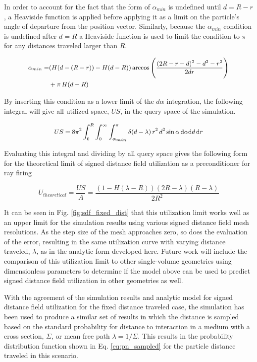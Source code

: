 In order to account for the fact that the form of $\alpha_{min}$ is undefined
until $d = R-r$, a Heaviside function is applied before applying it as a limit
on the particle's angle of departure from the position vector. Similarly,
because the $\alpha_{min}$ condition is undefined after $d=R$ a Heaviside
function is used to limit the condition to $\pi$ for any distances traveled
larger than $R$.

\begin{equation}
  \small
  \begin{split}
  \alpha_{min} =& (H(d-(R-r))-H(d-R)) \arccos\Bigg ( \frac{(2R-r-d)^2-d^2-r^2}{2 d r} \Bigg ) \\
  &+ \pi \, H(d-R)
  \end{split}
\end{equation}


By inserting this condition as a lower limit of the $d\alpha$ integration, the
following integral will give all utilized space, $US$, in the query space of the
simulation.

\begin{equation}
  \label{eq:subs_a_cond}
\small US = 8\pi^2  \int_{0}^{R}\int_{0}^{\infty}\int_{\boldsymbol{\alpha_{min}}}^{\pi} \delta(d-\lambda) \,
r^2 \, d^2 \sin{\alpha} \, \mathrm{d}\alpha \mathrm{d}d \, \mathrm{d}r
\end{equation}

Evaluating this integral and dividing by all query space gives the
following form for the theoretical limit of signed distance field utilization as a
preconditioner for ray firing

\begin{equation}
U_{theoretical} = \frac{US}{A} =  \frac{(1-H(\lambda-R))(2R-\lambda)(R-\lambda)}{2R^2}
\end{equation}

It can be seen in Fig. \ref{fig:sdf_fixed_dist} that this utilization limit
works well as an upper limit for the simulation results using various signed
distance field mesh resolutions. As the step size of the mesh approaches zero,
so does the evaluation of the error, resulting in the same utilization curve
with varying distance traveled, $\lambda$, as in the analytic form developed
here. Future work will include the comparison of this utilization limit to other
single-volume geometries using dimensionless parameters to determine if the
model above can be used to predict signed distance field utilization in other
geometries as well.

With the agreement of the simulation results and analytic model for signed
distance field utilization for the fixed distance traveled case, the simulation
has been used to produce a similar set of results in which the distance is
sampled based on the standard probability for distance to interaction in a
medium with a cross section, $\Sigma$, or mean free path $\lambda
=1/\Sigma$. This results in the probability distribution function shown in
Eq. \ref{eq:pn_sampled} for the particle distance traveled in this scenario.

